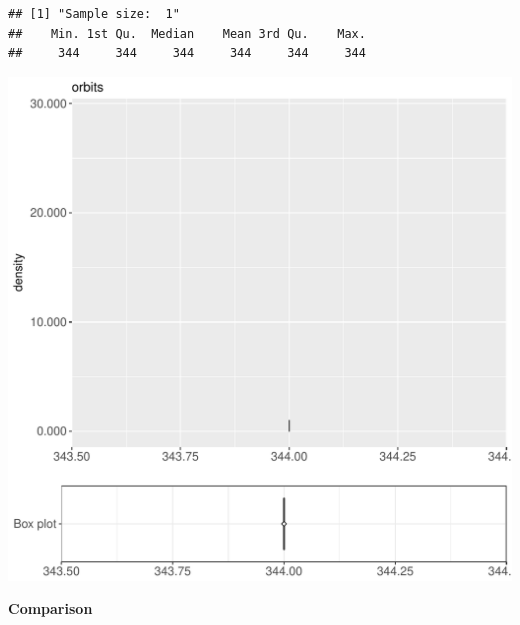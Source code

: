\documentclass{article}\usepackage[]{graphicx}\usepackage[]{color}
\makeatletter
\def\maxwidth{ %
  \ifdim\Gin@nat@width>\linewidth
    \linewidth
  \else
    \Gin@nat@width
  \fi
}
\newenvironment{kframe}{%
 \def\at@end@of@kframe{}%
 \ifinner\ifhmode%
  \def\at@end@of@kframe{\end{minipage}}%
  \begin{minipage}{\columnwidth}%
 \fi\fi%
 \def\FrameCommand##1{\hskip\@totalleftmargin \hskip-\fboxsep
 \colorbox{shadecolor}{##1}\hskip-\fboxsep
     \hskip-\linewidth \hskip-\@totalleftmargin \hskip\columnwidth}%
 \MakeFramed {\advance\hsize-\width
   \@totalleftmargin\z@ \linewidth\hsize
   \@setminipage}}%
 {\par\unskip\endMakeFramed%
 \at@end@of@kframe}
\newenvironment{knitrout}{}{} %
\makeatother
\begin{document}
\begin{knitrout}
\color{fgcolor}\begin{kframe}
\begin{verbatim}
## [1] "Sample size:  1"
##    Min. 1st Qu.  Median    Mean 3rd Qu.    Max. 
##     344     344     344     344     344     344
\end{verbatim}


{\ttfamily\noindent\bfseries{}}\end{kframe}
\includegraphics[width=\maxwidth]{figure/RH9_cashewExceptRenameVar_big-1} 

\end{knitrout}
  
 \textbf{Comparison}
  
\end{document}
